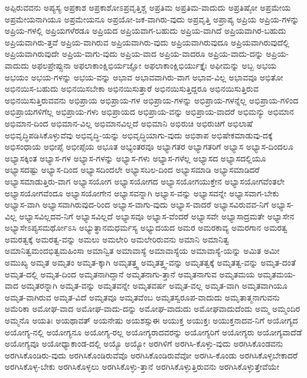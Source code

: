 {ಅಪ್ಪಿರುವವನು
ಅಪ್ಯಸ್ಯ
ಅಪ್ರಕಾಶ
ಅಪ್ರಕಾಶೋಽಪ್ರವೃತ್ತಿಶ್ಚ
ಅಪ್ರತಿಮ
ಅಪ್ರತಿಮ-ವಾದುದು
ಅಪ್ರತಿಷ್ಠೋ
ಅಪ್ರಮೇಯ
ಅಪ್ರಮೇಯನಾಗಿಯೂ
ಅಪ್ರಮೇಯನೂ
ಅಪ್ರಯೋ-ಜಕ-ವಾಗಿರು-ವುದು
ಅಪ್ರವೃತ್ತಿ
ಅಪ್ರಾಪ್ಯ
ಅಪ್ರಿಯ
ಅಪ್ರಿಯ-ಗಳನ್ನು
ಅಪ್ರಿಯ-ಗಳಲ್ಲಿ
ಅಪ್ರಿಯಗಳೆರಡೂ
ಅಪ್ರಿಯದ
ಅಪ್ರಿಯವಾಗ-ಬಹುದು
ಅಪ್ರಿಯ-ವಾಗಿದೆ
ಅಪ್ರಿಯವಾಗಿರ-ಬಹುದು
ಅಪ್ರಿಯವಾಗಿರು-ತ್ತವೆ
ಅಪ್ರಿಯ-ವಾಗಿರುವ
ಅಪ್ರಿಯವಾಗಿರು-ವುದು
ಅಪ್ರಿಯವಾಗಿರುವುದೂ
ಅಪ್ರಿಯವಾಗಿರುವುದೆಲ್ಲಿ
ಅಪ್ರಿಯವಾಗಿರುವುದೇ
ಅಪ್ರಿಯ-ವಾಗು-ವುದು
ಅಪ್ರಿಯ-ವಾದ
ಅಪ್ರಿಯ-ವಾದರೂ
ಅಪ್ರಿಯ-ವಾದು-ದನ್ನು
ಅಪ್ರಿಯ-ವಾದುದು
ಅಫಲಪ್ರೇಪ್ಸುನಾ
ಅಫಲಾಕಾಂಕ್ಷಿಭಿರ್ಯಜ್ಞೋ
ಅಫಲಾಕಾಂಕ್ಷಿಭಿರ್ಯುಕ್ತೈಃ
ಅಫೀಮನ್ನು
ಅಬ್ಬ
ಅಭಯ
ಅಭಯಂ
ಅಭಯ-ಗಳನ್ನು
ಅಭಯ-ವನ್ನು
ಅಭಾವ
ಅಭಾವವಾಗಿರು-ವಾಗ
ಅಭಾವ-ವಿಲ್ಲ
ಅಭಾವವೂ
ಅಭಿತೋ
ಅಭಿನಯಿಸ-ಬಹುದು
ಅಭಿನಯಿಸಬೇಕಾ
ಅಭಿನಯಿಸುತ್ತಾರೆ
ಅಭಿನಯಿಸುತ್ತಿದ್ದರೂ
ಅಭಿನಯಿಸುತ್ತಿರುವ
ಅಭಿನಯಿಸುತ್ತಿರುವವನು
ಅಭಿಪ್ರಾಯ
ಅಭಿಪ್ರಾಯ-ಗಳ
ಅಭಿಪ್ರಾಯ-ಗಳನ್ನು
ಅಭಿಪ್ರಾಯ-ಗಳನ್ನೆಲ್ಲ
ಅಭಿಪ್ರಾಯ-ಗಳಿಂದ
ಅಭಿಪ್ರಾಯಗಳಿಗೆಲ್ಲ
ಅಭಿಪ್ರಾಯ-ಗಳು
ಅಭಿಪ್ರಾಯದ
ಅಭಿಪ್ರಾಯ-ವನ್ನು
ಅಭಿಪ್ರಾಯ-ವಾದರೆ
ಅಭಿಮನ್ಯು
ಅಭಿಮಾನ
ಅಭಿಮಾನ-ದಿಂದ
ಅಭಿಮಾನ-ವಿಲ್ಲ
ಅಭಿಮಾನವಿಲ್ಲದೆ
ಅಭಿಮಾನಿ
ಅಭಿರುಚಿ
ಅಭಿರುಚಿಗೆ
ಅಭಿಲಾಷೆ
ಅಭಿವೃದ್ಧಿಪಡಿಸಿಕೊಳ್ಳುವೆವು
ಅಭಿವೃದ್ಧಿ-ಯನ್ನು
ಅಭಿವೃದ್ಧಿಯಾಗು-ವುದು
ಅಭಿಶಾಪ
ಅಭಿಷೇಕಮಾಡುವು-ದಕ್ಕೆ
ಅಭಿಸಂಧಾಯ
ಅಭೀಪ್ಸೆ
ಅಭೀಪ್ಸೆಯ
ಅಭೂತ
ಅಭ್ಯಂತರವೂ
ಅಭ್ಯಾಗತರ
ಅಭ್ಯಾಗತರಿಗೆ
ಅಭ್ಯಾಸ
ಅಭ್ಯಾಸ-ದಿಂದಲೂ
ಅಭ್ಯಾಸಕ್ಕಿಂತ
ಅಭ್ಯಾಸ-ಗಳ
ಅಭ್ಯಾಸ-ಗಳನ್ನು
ಅಭ್ಯಾಸ-ಗಳು
ಅಭ್ಯಾಸ-ಗಳೆಲ್ಲ
ಅಭ್ಯಾಸದ
ಅಭ್ಯಾಸದಲ್ಲಿಯೂ
ಅಭ್ಯಾಸದಷ್ಟು
ಅಭ್ಯಾಸ-ದಿಂದ
ಅಭ್ಯಾಸದಿಂದಲೇ
ಅಭ್ಯಾಸಬಲ-ದಿಂದ
ಅಭ್ಯಾಸಮಾಡಿ
ಅಭ್ಯಾಸಮಾಡಿದರೆ
ಅಭ್ಯಾಸಮಾಡುತ್ತಿರು-ವಾಗ
ಅಭ್ಯಾಸಯೋಗ
ಅಭ್ಯಾಸಯೋಗದ
ಅಭ್ಯಾಸಯೋಗಯುಕ್ತೇನ
ಅಭ್ಯಾಸಯೋಗವೆಂತಲೇ
ಅಭ್ಯಾಸಯೋಗವೆಂದೂ
ಅಭ್ಯಾಸಯೋಗೇನ
ಅಭ್ಯಾಸವನ್ನಾಗಿ
ಅಭ್ಯಾಸ-ವನ್ನು
ಅಭ್ಯಾಸವನ್ನೇ
ಅಭ್ಯಾಸವಾಗ-ಬೇಕು
ಅಭ್ಯಾಸ-ವಾಗಿ
ಅಭ್ಯಾಸವಾಗಿರುವುದ-ರಿಂದ
ಅಭ್ಯಾಸ-ವಾಗು-ವುದು
ಅಭ್ಯಾಸ-ವಾದರೆ
ಅಭ್ಯಾಸವಿರುವವ-ನಿಗೆ
ಅಭ್ಯಾಸ-ವಿಲ್ಲ
ಅಭ್ಯಾಸವಿಲ್ಲದವ-ನಿಗೆ
ಅಭ್ಯಾಸವಿಲ್ಲದೆ
ಅಭ್ಯಾಸವೂ
ಅಭ್ಯಾಸ-ವೆಂದರೆ
ಅಭ್ಯಾಸವೇ
ಅಭ್ಯಾಸಾದ್ರಮತೇ
ಅಭ್ಯಾಸೇನ
ಅಭ್ಯಾಸೇಽಪ್ಯಸಮರ್ಥೋಽಸಿ
ಅಭ್ಯುತ್ಥಾನಮಧರ್ಮಸ್ಯ
ಅಭ್ಯುದಯದ
ಅಮರ
ಅಮರಕಾವ್ಯ
ಅಮರಗಾನ
ಅಮರತ್ವ
ಅಮರತ್ವಕ್ಕೆ
ಅಮರತ್ವ-ವನ್ನು
ಅಮಲು
ಅಮಲೇರಿ
ಅಮಲೇರಿರುವನು
ಅಮಾನಿ
ಅಮಾನಿತ್ವ
ಅಮಾನಿತ್ವಮಂದಭಿತ್ವಮಹಿಂಸಾ
ಅಮಾನ್ವಿತ
ಅಮಾವಾಸ್ಯೆ
ಅಮಾವಾಸ್ಯೆಯ
ಅಮಾವಾಸ್ಯೆ-ಯನ್ನು
ಅಮಿತ
ಅಮೀ
ಅಮುಖ್ಯ
ಅಮೃತ
ಅಮೃತಂ
ಅಮೃತ-ಕ್ಕಾಗಿ
ಅಮೃತತ್ತ್ವ
ಅಮೃತತ್ತ್ವ-ವನ್ನು
ಅಮೃತತ್ವಕ್ಕೆ
ಅಮೃತತ್ವ-ವನ್ನು
ಅಮೃತ-ದಂತೆ
ಅಮೃತ-ದಲ್ಲಿ
ಅಮೃತ-ದಿಂದ
ಅಮೃತನಾಗಿದ್ದಾನೆ
ಅಮೃತನಾಗು-ತ್ತಾನೆ
ಅಮೃತನಾಗುವ
ಅಮೃತಮಯ
ಅಮೃತಮಯ-ವಾದ
ಅಮೃತರನ್ನಾಗಿ
ಅಮೃತ-ವನ್ನು
ಅಮೃತವನ್ನೇ
ಅಮೃತವರ್ಷ
ಅಮೃತ-ವಲ್ಲ
ಅಮೃತ-ವಾಗಿ
ಅಮೃತವಾಗಿಯೂ
ಅಮೃತ-ವಾಗಿರುವ
ಅಮೃತ-ವಿದೆ
ಅಮೃತವೂ
ಅಮೃತವೆಂಬ
ಅಮೃತಸ್ವರೂಪ-ವಾದುದು
ಅಮೃತಾತ್ಮನಾಗುವನು
ಅಮೆರಿಕಾ
ಅಮೋಘ-ವಾದ
ಅಮೋಘ-ವಾದು-ದನ್ನು
ಅಮೋಘ-ವಾದುದು
ಅಮೋಘವಾದುದೆಂದು
ಅಮ್ಮ
ಅಮ್ಮಂದಿರ
ಅಮ್ಮನೊ
ಅಯತಿಃ
ಅಯಥಾವತ್
ಅಯನೇಷು
ಅಯಶಸ್ಸುಈ
ಅಯುಕ್ತ
ಅಯುಕ್ತಃ
ಅಯುಕ್ತನಾದವ-ನಿಗೆ
ಅಯೋಗ್ಯದ
ಅಯೋಗ್ಯ-ನಲ್ಲಿ
ಅಯೋಗ್ಯನೂ
ಅಯೋಗ್ಯ-ರಲ್ಲ
ಅಯೋಗ್ಯರಾದವರನ್ನು
ಅಯೋಗ್ಯರಿಗೆ
ಅಯೋಗ್ಯರು
ಅಯೋಗ್ಯವಾದೆಡೆ
ಅಯೋಗ್ಯವೂ
ಅಯೋಧ್ಯಾಕಾಂಡ-ದಲ್ಲಿ
ಅಯ್ಯೊ
ಅಯ್ಯೋ
ಅರಗಿಳಿಗೆ
ಅರಗಿಸಿ-ಕೊಳ್ಳು-ವುದು
ಅರಗಿಸಿಕೊಂಡವನು
ಅರಗಿಸಿಕೊಂಡಿರು-ವುದು
ಅರಗಿಸಿಕೊಂಡಿರುವೆವೊ
ಅರಗಿಸಿಕೊಂಡಿರುವೆವೋ
ಅರಗಿಸಿ-ಕೊಂಡು
ಅರಗಿಸಿಕೊಳ್ಳಬೇಕಾದರೆ
ಅರಗಿಸಿಕೊಳ್ಳ-ಬೇಕು
ಅರಗಿಸಿಕೊಳ್ಳಲು
ಅರಗಿಸಿಕೊಳ್ಳು-ತ್ತಾನೆ
ಅರಗಿಸಿಕೊಳ್ಳುತ್ತಿರುವನು
ಅರಗಿಸಿಕೊಳ್ಳುತ್ತೇವೆಯೇ
}
